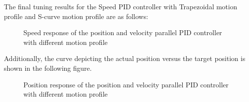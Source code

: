 \documentclass[11pt,a4paper]{article}%
\begin{document}
The final tuning results for the Speed PID controller with Trapezoidal motion profile and S-curve motion profile are as follows:
\begin{figure}[H]
    \centering
    \caption{Speed response of the position and velocity parallel PID controller with different motion profile}
    \label{1}
\end{figure}
Additionally, the curve depicting the actual position versus the target position is shown in the following figure.
\begin{figure}[H]
    \centering
    \caption{Position response of the position and velocity parallel PID controller with different motion profile}
    \label{2}
\end{figure}
\end{document}
